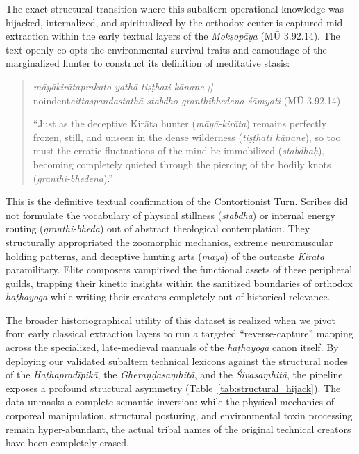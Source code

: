 \documentclass[11pt,twoside,letterpaper]{article}
\begin{document}
The exact structural transition where this subaltern operational knowledge was hijacked, internalized, and spiritualized by the orthodox center is captured mid-extraction within the early textual layers of the \textit{Mokṣopāya} (MŪ 3.92.14). The text openly co-opts the environmental survival traits and camouflage of the marginalized hunter to construct its definition of meditative stasis:

\begin{quote}
\small
\noindent\textit{māyākirātaprakato yathā tiṣṭhati kānane || } \\noindent\textit{cittaspandastathā stabdho granthibhedena śāmyati} (MŪ 3.92.14)
\medskip

``Just as the deceptive Kirāta hunter (\textit{māyā-kirāta}) remains perfectly frozen, still, and unseen in the dense wilderness (\textit{tiṣṭhati kānane}), so too must the erratic fluctuations of the mind be immobilized (\textit{stabdhaḥ}), becoming completely quieted through the piercing of the bodily knots (\textit{granthi-bhedena}).''
\end{quote}

This is the definitive textual confirmation of the Contortionist Turn. Scribes did not formulate the vocabulary of physical stillness (\textit{stabdha}) or internal energy routing (\textit{granthi-bheda}) out of abstract theological contemplation. They structurally appropriated the zoomorphic mechanics, extreme neuromuscular holding patterns, and deceptive hunting arts (\textit{māyā}) of the outcaste \textit{Kirāta} paramilitary. Elite composers vampirized the functional assets of these peripheral guilds, trapping their kinetic insights within the sanitized boundaries of orthodox \textit{haṭhayoga} while writing their creators completely out of historical relevance.

The broader historiographical utility of this dataset is realized when we pivot from early classical extraction layers to run a targeted ``reverse-capture'' mapping across the specialized, late-medieval manuals of the \textit{haṭhayoga} canon itself. By deploying our validated subaltern technical lexicons against the structural nodes of the \textit{Haṭhapradīpikā}, the \textit{Gheraṇḍasaṃhitā}, and the \textit{Śivasaṃhitā}, the pipeline exposes a profound structural asymmetry (Table~\ref{tab:structural_hijack}). The data unmasks a complete semantic inversion: while the physical mechanics of corporeal manipulation, structural posturing, and environmental toxin processing remain hyper-abundant, the actual tribal names of the original technical creators have been completely erased.
\end{document}
